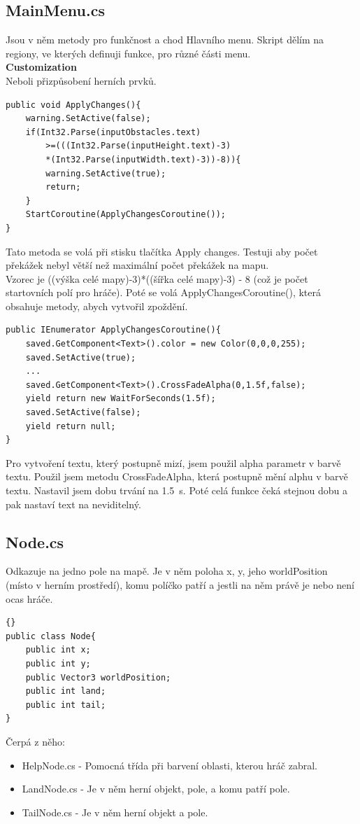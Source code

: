 \documentclass[12pt,a4paper]{report}
\begin{document}
\subsection{MainMenu.cs}
Jsou v něm metody pro funkčnost a chod Hlavního menu.
Skript dělím na regiony, ve kterých definuji funkce, pro různé části menu. \\
\textbf{Customization} \\
Neboli přizpůsobení herních prvků.
\begin{lstlisting}
public void ApplyChanges(){
    warning.SetActive(false);
    if(Int32.Parse(inputObstacles.text)
        >=(((Int32.Parse(inputHeight.text)-3)
        *(Int32.Parse(inputWidth.text)-3))-8)){
        warning.SetActive(true);
        return;
    }
    StartCoroutine(ApplyChangesCoroutine());
}
\end{lstlisting}
Tato metoda se volá při stisku tlačítka Apply changes.
Testuji aby počet překážek nebyl větší než maximální počet překážek na mapu.
\\
Vzorec je ((výška celé mapy)-3)*((šířka celé mapy)-3) - 8 (což je počet startovních polí pro hráče).
Poté se volá ApplyChangesCoroutine(), která obsahuje metody, abych vytvořil zpoždění.
\newpage
\begin{lstlisting}
public IEnumerator ApplyChangesCoroutine(){
    saved.GetComponent<Text>().color = new Color(0,0,0,255);
    saved.SetActive(true);
    ...
    saved.GetComponent<Text>().CrossFadeAlpha(0,1.5f,false);
    yield return new WaitForSeconds(1.5f);
    saved.SetActive(false);
    yield return null;
}   
\end{lstlisting}
Pro vytvoření textu, který postupně mizí, jsem použil alpha parametr v barvě textu.
Použil jsem metodu CrossFadeAlpha, která postupně mění alphu v barvě textu.
Nastavil jsem dobu trvání na 1.5~s.
Poté celá funkce čeká stejnou dobu a pak nastaví text na neviditelný.
\subsection{Node.cs}
Odkazuje na jedno pole na mapě. Je v něm poloha x, y, jeho worldPosition (místo v herním prostředí), komu políčko patří a jestli na něm právě je nebo není ocas hráče.
\begin{lstlisting}[]{}
public class Node{
    public int x;
    public int y;
    public Vector3 worldPosition;
    public int land;
    public int tail;
}
\end{lstlisting}
Čerpá z něho:
\begin{itemize}
    \item   HelpNode.cs - Pomocná třída při barvení oblasti, kterou hráč zabral.
    \item   LandNode.cs - Je v něm herní objekt, pole, a komu patří pole.
    \item   TailNode.cs - Je v něm herní objekt a pole.
\end{itemize}
\end{document}
